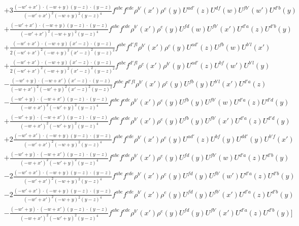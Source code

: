 \documentclass[aps,prd,amsmath,amssymb,nofootinbib]{revtex4-2}
\numberwithin{equation}{section}
\begin{document}
\begin{align}
    &+ 3 \frac{( - w' + x') \cdot ( - w + y) (y - z) \cdot (y - z)}{( - w' + x')^{2} ( - w + y)^{2} (y - z)^{4}} f^{a b c} f^{c d e} \rho^{b'}(x') \rho^{e}(y) U^{a d'}(z) U^{d f}(w) U^{f b'}(w') U^{d' b}(y)\nonumber\\
    &+  \frac{( - w' + x') \cdot ( - w + y) (y - z) \cdot (y - z)}{( - w' + x')^{2} ( - w + y)^{2} (y - z)^{4}} f^{a b c} f^{c d e} \rho^{b'}(x') \rho^{e}(y) U^{f d}(w) U^{f b'}(x') U^{d' a}(z) U^{d' b}(y)\nonumber\\
    &+ \frac{( - w' + x') \cdot ( - w + y) (x' - z) \cdot (y - z)}{2 ( - w' + x')^{2} ( - w + y)^{2} (x' - z)^{2} (y - z)^{2}} f^{a b c} f^{d' f l} \rho^{b'}(x') \rho^{c}(y) U^{a d'}(z) U^{f b}(w) U^{b' l}(x') \nonumber\\
      &+ \frac{( - w' + x') \cdot ( - w + y) (x' - z) \cdot (y - z)}{2 ( - w' + x')^{2} ( - w + y)^{2} (x' - z)^{2} (y - z)^{2}} f^{a b c} f^{d' f l} \rho^{c}(x') \rho^{b'}(y) U^{a d'}(z) U^{b f}(w') U^{b' l}(y) \nonumber\\
      &-  \frac{( - w' + y) \cdot ( - w + x') (x' - z) \cdot (y - z)}{( - w + x')^{2} ( - w' + y)^{2} (x' - z)^{2} (y - z)^{2}} f^{a b c} f^{d' f l} \rho^{b'}(x') \rho^{c}(y) U^{f b}(y) U^{b' l}(x') U^{d' a}(z) \nonumber\\
      &- \frac{( - w' + y) \cdot ( - w + x') (y - z) \cdot (y - z)}{( - w + x')^{2} ( - w' + y)^{2} (y - z)^{4}} f^{a b c} f^{c d e} \rho^{b'}(x') \rho^{e}(y) U^{f b}(y) U^{f b'}(w) U^{d' a}(z) U^{d' d}(y)\nonumber\\
      &+ \frac{( - w' + y) \cdot ( - w + x') (y - z) \cdot (y - z)}{( - w + x')^{2} ( - w' + y)^{2} (y - z)^{4}} f^{a b c} f^{c d e} \rho^{b'}(x') \rho^{e}(y) U^{f b}(y) U^{f b'}(x') U^{d' a}(z) U^{d' d}(y)\nonumber\\
       &+ 2 \frac{( - w' + x') \cdot ( - w + y) (y - z) \cdot (y - z)}{( - w' + x')^{2} ( - w + y)^{2} (y - z)^{4}} f^{a b c} f^{c d e} \rho^{b'}(x') \rho^{e}(y) U^{a d'}(z) U^{b f}(y) U^{d d'}(y) U^{b' f}(x')\nonumber\\
    &+ \frac{( - w' + y) \cdot ( - w + x') (y - z) \cdot (y - z)}{( - w + x')^{2} ( - w' + y)^{2} (y - z)^{4}} f^{a b c} f^{c d e} \rho^{b'}(x') \rho^{e}(y) U^{f d}(y) U^{f b'}(w) U^{d' a}(z) U^{d' b}(y)\nonumber\\
    &- 2 \frac{( - w' + x') \cdot ( - w + y) (y - z) \cdot (y - z)}{( - w' + x')^{2} ( - w + y)^{2} (y - z)^{4}} f^{a b c} f^{c d e} \rho^{b'}(x') \rho^{e}(y) U^{f d}(y) U^{f b'}(w') U^{d' a}(z) U^{d' b}(y)\nonumber\\
    &- 2 \frac{( - w' + x') \cdot ( - w + y) (y - z) \cdot (y - z)}{( - w' + x')^{2} ( - w + y)^{2} (y - z)^{4}} f^{a b c} f^{c d e} \rho^{b'}(x') \rho^{e}(y) U^{f d}(y) U^{f b'}(x') U^{d' a}(z) U^{d' b}(y)\nonumber\\
    &- \frac{( - w' + y) \cdot ( - w + x') (y - z) \cdot (y - z)}{( - w + x')^{2} ( - w' + y)^{2} (y - z)^{4}} f^{a b c} f^{c d e} \rho^{b'}(x') \rho^{e}(y) U^{f d}(y) U^{f b'}(x') U^{d' a}(z) U^{d' b}(y)\Bigg]
\end{align}
\end{document}
